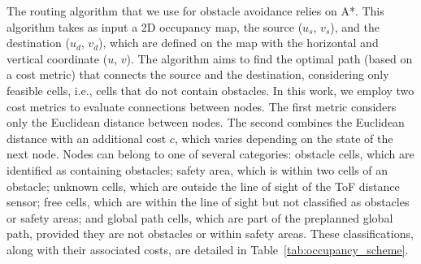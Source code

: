 The routing algorithm that we use for obstacle avoidance relies on A*. 
This algorithm takes as input a 2D occupancy map, the source ($u_s$, $v_s$), and the destination ($u_d$, $v_d$), which are defined on the map with the horizontal and vertical coordinate ($u$, $v$).
The algorithm aims to find the optimal path (based on a cost metric) that connects the source and the destination, considering only feasible cells, i.e., cells that do not contain obstacles.
In this work, we employ two cost metrics to evaluate connections between nodes. 
The first metric considers only the Euclidean distance between nodes. 
The second combines the Euclidean distance with an additional cost $c$, which varies depending on the state of the next node. 
Nodes can belong to one of several categories: obstacle cells, which are identified as containing obstacles; safety area, which is within two cells of an obstacle; unknown cells, which are outside the line of sight of the ToF distance sensor; free cells, which are within the line of sight but not classified as obstacles or safety areas; and global path cells, which are part of the preplanned global path, provided they are not obstacles or within safety areas. 
These classifications, along with their associated costs, are detailed in Table~\ref{tab:occupancy_scheme}.

